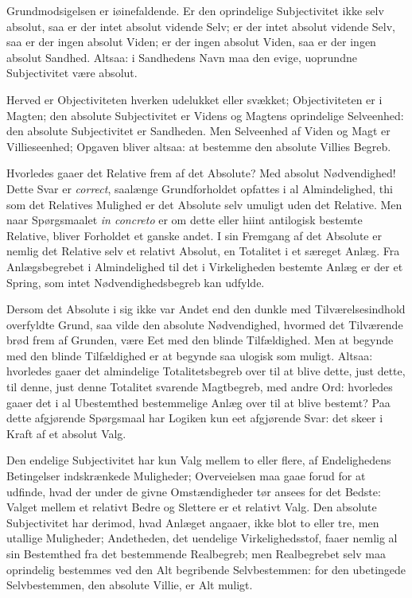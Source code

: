 \documentclass[12pt]{book}
\newcommand{\opage}[1]{\marginnote{\footnotesize\textit{[#1]}}}
\begin{document}
Grundmodsigelsen er iøinefaldende. Er den oprindelige Subjectivitet
ikke selv absolut, saa er der intet absolut vidende Selv; er der
intet absolut vidende Selv, saa er der ingen absolut Viden; er der
ingen absolut Viden, saa er der ingen absolut Sandhed. Altsaa: i
Sandhedens Navn maa den evige, uoprundne Subjectivitet være absolut.

Herved er Objectiviteten hverken udelukket eller svækket;
Objectiviteten er i Magten; den absolute Subjectivitet er Videns og
Magtens oprindelige Selveenhed: den absolute
\opage{59} Subjectivitet er Sandheden. Men Selveenhed af Viden og Magt er
Villieseenhed; Opgaven bliver altsaa: at bestemme den absolute
Villies Begreb.

Hvorledes gaaer det Relative frem af det Absolute? Med absolut
Nødvendighed! Dette Svar er \textit{correct}, saalænge
Grundforholdet opfattes i al Almindelighed, thi som det Relatives
Mulighed er det Absolute selv umuligt uden det Relative. Men naar
Spørgsmaalet \textit{in concreto} er om dette eller hiint antilogisk
bestemte Relative, bliver Forholdet et ganske andet. I sin Fremgang
af det Absolute er nemlig det Relative selv et relativt Absolut, en
Totalitet i et særeget Anlæg. Fra Anlægsbegrebet i Almindelighed til
det i Virkeligheden bestemte Anlæg er der et Spring, som intet
Nødvendighedsbegreb kan udfylde.

Dersom det Absolute i sig ikke var Andet end den dunkle med
Tilværelsesindhold overfyldte Grund, saa vilde den absolute
Nødvendighed, hvormed det Tilværende brød frem af Grunden, være Eet
med den blinde Tilfældighed. Men at begynde med den blinde
Tilfældighed er at begynde saa ulogisk som muligt. Altsaa: hvorledes
gaaer det almindelige Totalitetsbegreb over til at blive dette, just
dette, til denne, just denne Totalitet svarende Magtbegreb, med
andre Ord: hvorledes gaaer det i al Ubestemthed bestemmelige Anlæg
over til at blive bestemt? Paa dette afgjørende Spørgsmaal har
Logiken kun eet afgjørende Svar: det skeer i Kraft af et absolut
Valg.

Den endelige Subjectivitet har kun Valg mellem to eller flere, af
Endelighedens Betingelser indskrænkede Muligheder; Overveielsen maa
gaae forud for at udfinde, hvad der under de givne Omstændigheder
tør ansees for det Bedste: Valget mellem et relativt Bedre og
Slettere er et relativt Valg. Den absolute Subjectivitet har
derimod, hvad Anlæget angaaer, ikke blot to eller tre, men utallige
Muligheder; Andetheden, det uendelige Virkelighedsstof, faaer
\opage{60} nemlig al sin Bestemthed fra det bestemmende Realbegreb; men
Realbegrebet selv maa oprindelig bestemmes ved den Alt begribende
Selvbestemmen: for den ubetingede Selvbestemmen, den absolute
Villie, er Alt muligt.
\end{document}

